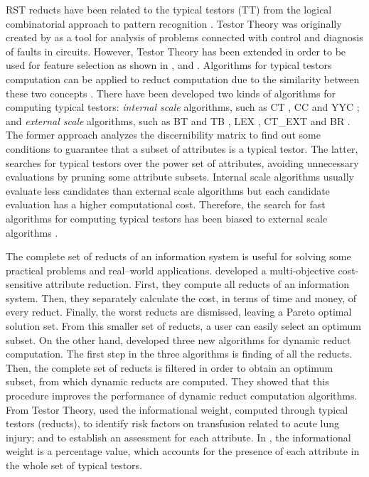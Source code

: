 \documentclass[authoryear,preprint,review,12pt]{elsarticle}
\begin{document}
  RST reducts have been related to the typical testors (TT) from the logical combinatorial approach 
  to pattern recognition \citep{Chikalov2013}. Testor Theory was originally created by \cite{Cheguis55} as a tool
  for analysis of problems connected with control and diagnosis of faults in circuits. 
  However, Testor Theory has been extended in order to be used for feature selection as shown in \citep{Dmitriev1966}, \citep{Martinez01} and \citep{Ruiz08}. Algorithms for typical testors computation can be applied to reduct computation due to the similarity between these two concepts \citep{Lazo15}. There have been developed two kinds of algorithms for computing typical testors: \emph{internal scale} algorithms, such as CT \citep{Bravo83}, CC \citep{Aguila84} and YYC \citep{Alba14}; and \emph{external scale} algorithms, such as BT and TB \citep{Ruiz85}, LEX \citep{Santiesteban03}, CT\_EXT \citep{Sanchez07} and BR \citep{Lias09}. The former approach analyzes the discernibility matrix to find out some conditions to guarantee that a subset of attributes is a typical testor. The latter, searches for typical testors over the power set of attributes, avoiding unnecessary evaluations by pruning some attribute subsets. Internal scale algorithms usually evaluate less candidates than external scale algorithms but each candidate evaluation has a higher computational cost. Therefore, the search for fast algorithms for computing typical testors has been biased to external scale algorithms \citep{Alba14}.
    
  The complete set of reducts of an information system is useful for solving some practical problems and real--world applications. \cite{Xu2013} developed a multi-objective cost-sensitive attribute reduction. First, they compute all reducts of an information system. Then, they separately calculate the cost, in terms of time and money, of every reduct. Finally, the worst reducts are dismissed, leaving a Pareto optimal solution set. From this smaller set of reducts, a user can easily select an optimum subset. On the other hand, \cite{Mukamakuza2014} developed three new algorithms for dynamic reduct computation. 
  The first step in the three algorithms is finding of all the reducts. Then, the complete set of reducts 
  is filtered in order to obtain an optimum subset, from which dynamic reducts are computed. They showed that 
  this procedure improves the performance of dynamic reduct computation algorithms.	
  From Testor Theory, \cite{Torres2014} used the informational weight, computed through typical testors 
  (reducts), to identify risk factors on transfusion related to acute lung injury; and to establish an assessment
  for each attribute.  In \citep{Torres2014}, the informational weight is a percentage value, which accounts 
  for the presence of each attribute in the whole set of typical testors. 
	
\end{document}
